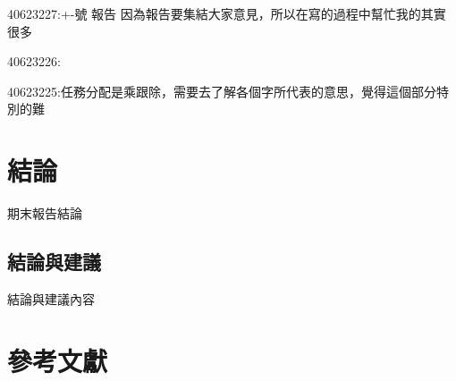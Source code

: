 \documentclass[12pt,,]{report}
\begin{document}
40623227:+-號 報告
因為報告要集結大家意見，所以在寫的過程中幫忙我的其實很多

40623226:

40623225:任務分配是乘跟除，需要去了解各個字所代表的意思，覺得這個部分特別的難

\hypertarget{ux7d50ux8ad6-1}{%
\chapter{結論}\label{ux7d50ux8ad6-1}}

期末報告結論

\hypertarget{ux7d50ux8ad6ux8207ux5efaux8b70}{%
\section{結論與建議}\label{ux7d50ux8ad6ux8207ux5efaux8b70}}

結論與建議內容

\hypertarget{ux53c3ux8003ux6587ux737b}{%
\chapter{參考文獻}\label{ux53c3ux8003ux6587ux737b}}
\end{document}
